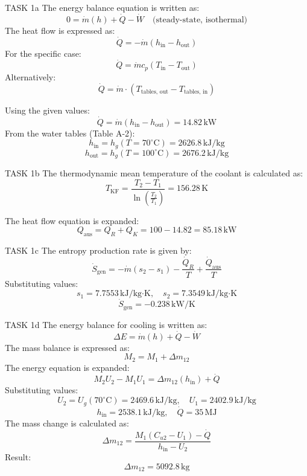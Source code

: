 TASK 1a  
The energy balance equation is written as:  
\[
0 = \dot{m}(h) + \dot{Q} - \dot{W} \quad \text{(steady-state, isothermal)}
\]  
The heat flow is expressed as:  
\[
\dot{Q} = -\dot{m}(h_{\text{in}} - h_{\text{out}})
\]  
For the specific case:  
\[
\dot{Q} = \dot{m} c_p (T_{\text{in}} - T_{\text{out}})
\]  
Alternatively:  
\[
\dot{Q} = \dot{m} \cdot (T_{\text{tables, out}} - T_{\text{tables, in}})
\]  

Using the given values:  
\[
\dot{Q} = \dot{m}(h_{\text{in}} - h_{\text{out}}) = 14.82 \, \text{kW}
\]  
From the water tables (Table A-2):  
\[
h_{\text{in}} = h_g(T = 70^\circ\text{C}) = 2626.8 \, \text{kJ/kg}
\]  
\[
h_{\text{out}} = h_g(T = 100^\circ\text{C}) = 2676.2 \, \text{kJ/kg}
\]  

TASK 1b  
The thermodynamic mean temperature of the coolant is calculated as:  
\[
T_{\text{KF}} = \frac{T_2 - T_1}{\ln\left(\frac{T_2}{T_1}\right)} = 156.28 \, \text{K}
\]  

The heat flow equation is expanded:  
\[
Q_{\text{aus}} = Q_R + Q_K = 100 - 14.82 = 85.18 \, \text{kW}
\]  

TASK 1c  
The entropy production rate is given by:  
\[
\dot{S}_{\text{gen}} = -\dot{m}(s_2 - s_1) - \frac{\dot{Q}_R}{T} + \frac{\dot{Q}_{\text{aus}}}{T}
\]  
Substituting values:  
\[
s_1 = 7.7553 \, \text{kJ/kg·K}, \quad s_2 = 7.3549 \, \text{kJ/kg·K}
\]  
\[
\dot{S}_{\text{gen}} = -0.238 \, \text{kW/K}
\]  

TASK 1d  
The energy balance for cooling is written as:  
\[
\Delta E = \dot{m}(h) + \dot{Q} - \dot{W}
\]  
The mass balance is expressed as:  
\[
M_2 = M_1 + \Delta m_{12}
\]  
The energy equation is expanded:  
\[
M_2 U_2 - M_1 U_1 = \Delta m_{12}(h_{\text{in}}) + \dot{Q}
\]  
Substituting values:  
\[
U_2 = U_g(70^\circ\text{C}) = 2469.6 \, \text{kJ/kg}, \quad U_1 = 2402.9 \, \text{kJ/kg}
\]  
\[
h_{\text{in}} = 2538.1 \, \text{kJ/kg}, \quad \dot{Q} = 35 \, \text{MJ}
\]  
The mass change is calculated as:  
\[
\Delta m_{12} = \frac{M_1(C_{u2} - U_1) - \dot{Q}}{h_{\text{in}} - U_2}
\]  
Result:  
\[
\Delta m_{12} = 5092.8 \, \text{kg}
\]